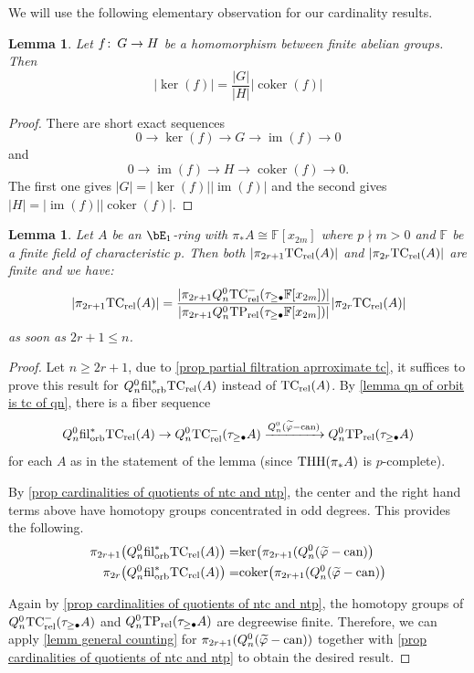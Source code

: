 \documentclass[english,10pt]{amsart}
\DeclareMathOperator{\kernel}{ker}
\DeclareMathOperator{\coker}{coker}
\DeclareMathOperator{\im}{im}
\newcommand{\rel}{\textup{rel}}
\newcommand{\field}{\mathbb{F}}
\newtheorem{lem}{Lemma}[section]
\newtheorem{lemm}{Lemma}[section]
\theoremstyle{definition}
\numberwithin{equation}{section}
\DeclareMathOperator{\thh}{\ensuremath{\textup{THH}}}
\newcommand{\rntc}{\mathrm{TC}_{\rel}^{-}}
\newcommand{\rtp}{\mathrm{TP}_{\rel}}
\newcommand{\rtc}{\mathrm{TC}_{\rel}}
\newcommand{\filorb}{\mathrm{fil}^{*}_{\textup{orb}}}
\DeclareMathOperator{\can}{\ensuremath{\textup{can}}}
\newcommand{\wtw}{\tau_{\geq \bullet}}
\newcommand{\pis}{\pi_*}
\def\co{\colon\thinspace}
\newcommand{\lv}{\lvert}
\newcommand{\rv}{\rvert}
\begin{document}
We will use the following elementary observation for our cardinality results.

\begin{lem}\label{lemm general counting}
    Let $f \co G \to H$ be a homomorphism between finite abelian groups. Then 
    \[
    \lv \kernel(f) \rv = \frac{\lv G \rv}{\lv H \rv} \lv \coker(f) \rv 
    \]
\end{lem}
\begin{proof}
    There are short exact sequences 
    \[0 \to \kernel (f) \to G \to \im(f) \to 0\]
    and 
    \[0 \to \im(f) \to H \to \coker(f)\to 0.\]
    The first one gives $\lv G \rv = \lv \kernel (f)\rv \lv \im(f)\rv$ and the second gives $\lv H \rv = \lv \im(f) \rv \lv \coker(f) \rv$. 
\end{proof}





\begin{lemm}\label{lemm odd and even tc group cardinality in terms of quotients of quotient ntc and tp}
Let $A$ be an $\bE_1$-ring with $\pis A \cong \field[x_{2m}]$ where $p \nmid m >0$  and $\field$ be a finite field of characteristic $p$. 
Then both $\lvert \pi_{2r+1}\rtc (A) \rvert$ and $\lvert \pi_{2r} \rtc (A)\rvert$ are finite and we have:
\[
\lvert \pi_{2r+1}\rtc (A) \rvert = \frac{\lvert \pi_{2r+1} Q_n^0 \rntc(\tau_{\geq \bullet} \field[x_{2m}]) \rvert}{\lvert \pi_{2r+1} Q_n^0 \rtp(\tau_{\geq \bullet} \field[x_{2m}]) \rvert} \lvert \pi_{2r} \rtc (A)\rvert 
\]
as soon as $2r+1\leq n$.
\end{lemm}
\begin{proof}
Let $n\geq2r+1$, due to \autoref{prop partial filtration aprroximate tc}, it suffices to prove this result for $Q_n^0 \filorb \rtc(A)$ instead of  $\rtc(A)$. By \autoref{lemma qn of orbit is tc of qn}, there is a fiber sequence 
\[Q_n^0 \filorb \rtc(A) \to Q_n^0 \rntc(\tau_{\geq \bullet} A) \xrightarrow{Q_n^0(\widetilde{\varphi}-\can)} Q_n^0 \rtp(\wtw A)\]
for each $A$ as in the statement of the lemma (since $\thh(\pis A)$ is $p$-complete). 

By \autoref{prop cardinalities of quotients of ntc and ntp}, the center and the right hand terms above have homotopy groups concentrated in odd degrees. This provides the following. 
\begin{equation*}
\begin{split}
\pi_{2r+1}\big( Q_n^0 \filorb \rtc(A)\big) =& \textup{ker}\big(\pi_{2r+1}(Q_n^0(\widetilde{\varphi}-\can)\big) \\
\pi_{2r}\big( Q_n^0 \filorb \rtc(A)\big) = &\textup{coker}\big(\pi_{2r+1}(Q_n^0(\widetilde{\varphi}-\can)\big)
\end{split}
\end{equation*}

Again by \autoref{prop cardinalities of quotients of ntc and ntp},  the  homotopy groups of $Q_n^0 \rntc(\tau_{\geq \bullet} A)$ and $Q_n^0 \rtp(\tau_{\geq \bullet} A)$ are degreewise finite. Therefore, we can apply \autoref{lemm general counting} for $\pi_{2r+1}(Q_n^0(\widetilde{\varphi}-\can))$ together with \autoref{prop cardinalities of quotients of ntc and ntp}  to obtain the desired result.
\end{proof}
\end{document}
